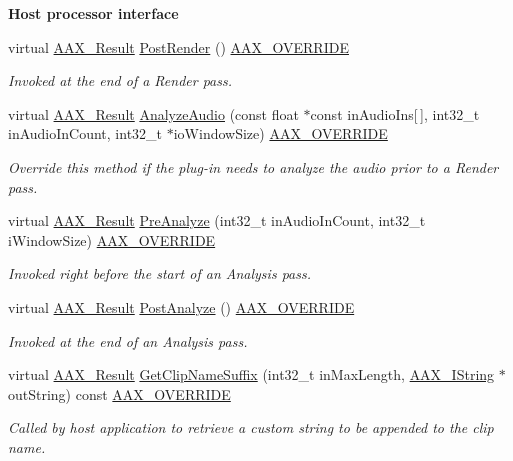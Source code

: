 \begin{Indent}{\bf Host processor interface}
\begin{DoxyCompactItemize}
virtual \hyperlink{a00149_a4d8f69a697df7f70c3a8e9b8ee130d2f}{A\+A\+X\+\_\+\+Result} \hyperlink{a00020_aa0415cb0bdf991c295c71bd9899489df}{Post\+Render} () \hyperlink{a00149_ac2f24a5172689ae684344abdcce55463}{A\+A\+X\+\_\+\+O\+V\+E\+R\+R\+I\+D\+E}
\begin{DoxyCompactList}\small\item\em Invoked at the end of a Render pass. \end{DoxyCompactList}\item 
virtual \hyperlink{a00149_a4d8f69a697df7f70c3a8e9b8ee130d2f}{A\+A\+X\+\_\+\+Result} \hyperlink{a00020_adec65f5e13856b0bfcb3fbe9200213cf}{Analyze\+Audio} (const float $\ast$const in\+Audio\+Ins\mbox{[}$\,$\mbox{]}, int32\+\_\+t in\+Audio\+In\+Count, int32\+\_\+t $\ast$io\+Window\+Size) \hyperlink{a00149_ac2f24a5172689ae684344abdcce55463}{A\+A\+X\+\_\+\+O\+V\+E\+R\+R\+I\+D\+E}
\begin{DoxyCompactList}\small\item\em Override this method if the plug-\/in needs to analyze the audio prior to a Render pass. \end{DoxyCompactList}\item 
virtual \hyperlink{a00149_a4d8f69a697df7f70c3a8e9b8ee130d2f}{A\+A\+X\+\_\+\+Result} \hyperlink{a00020_a3b43c44e627036241cb2d1d57d1bff34}{Pre\+Analyze} (int32\+\_\+t in\+Audio\+In\+Count, int32\+\_\+t i\+Window\+Size) \hyperlink{a00149_ac2f24a5172689ae684344abdcce55463}{A\+A\+X\+\_\+\+O\+V\+E\+R\+R\+I\+D\+E}
\begin{DoxyCompactList}\small\item\em Invoked right before the start of an Analysis pass. \end{DoxyCompactList}\item 
virtual \hyperlink{a00149_a4d8f69a697df7f70c3a8e9b8ee130d2f}{A\+A\+X\+\_\+\+Result} \hyperlink{a00020_ae7c61a3642cf0fc2c7915b426fa01cad}{Post\+Analyze} () \hyperlink{a00149_ac2f24a5172689ae684344abdcce55463}{A\+A\+X\+\_\+\+O\+V\+E\+R\+R\+I\+D\+E}
\begin{DoxyCompactList}\small\item\em Invoked at the end of an Analysis pass. \end{DoxyCompactList}\item 
virtual \hyperlink{a00149_a4d8f69a697df7f70c3a8e9b8ee130d2f}{A\+A\+X\+\_\+\+Result} \hyperlink{a00020_a97b29831dde192bdc2e9e0290f60e8c6}{Get\+Clip\+Name\+Suffix} (int32\+\_\+t in\+Max\+Length, \hyperlink{a00113}{A\+A\+X\+\_\+\+I\+String} $\ast$out\+String) const \hyperlink{a00149_ac2f24a5172689ae684344abdcce55463}{A\+A\+X\+\_\+\+O\+V\+E\+R\+R\+I\+D\+E}
\begin{DoxyCompactList}\small\item\em Called by host application to retrieve a custom string to be appended to the clip name. \end{DoxyCompactList}\end{DoxyCompactItemize}
\end{Indent}
